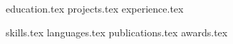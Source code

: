 \documentclass[letterpaper,11pt]{article}
\begin{document}

{}
{education.tex}
{projects.tex}
{experience.tex}



    {{skills.tex}}
    {{languages.tex}}
{publications.tex}
{awards.tex}
\end{document}
